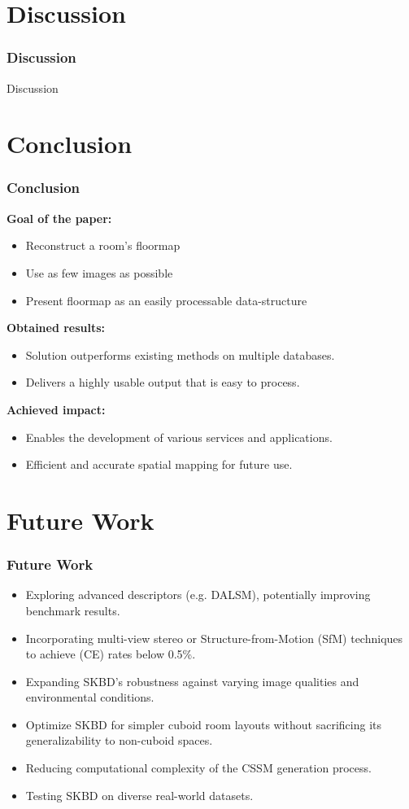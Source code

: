 \documentclass{beamer}
\begin{document}
\section{Discussion}
\begin{frame}
\frametitle{Discussion}
Discussion
\end{frame}

\section{Conclusion}
\begin{frame}
\frametitle{Conclusion}
\textbf{Goal of the paper:}
\begin{itemize}
    \item Reconstruct a room's floormap
    \item Use as few images as possible
    \item Present floormap as an easily processable data-structure
\end{itemize}
\textbf{Obtained results:}
\begin{itemize}
    \item Solution outperforms existing methods on multiple databases.
    \item Delivers a highly usable output that is easy to process.
\end{itemize}
\textbf{Achieved impact:}
\begin{itemize}
    \item Enables the development of various services and applications.
    \item Efficient and accurate spatial mapping for future use.
\end{itemize}
\end{frame}

\section{Future Work}
\begin{frame}
\frametitle{Future Work}
\begin{itemize}
    \item Exploring advanced descriptors (e.g. DALSM), potentially improving benchmark results.
    \item Incorporating multi-view stereo or Structure-from-Motion (SfM) techniques to achieve (CE) rates below 0.5\%.
    \item Expanding SKBD’s robustness against varying image qualities and environmental conditions. 
    \item Optimize SKBD for simpler cuboid room layouts without sacrificing its generalizability to non-cuboid spaces.
    \item Reducing computational complexity of the CSSM generation process.
    \item Testing SKBD on diverse real-world datasets.
\end{itemize}
\end{frame}
\end{document}

